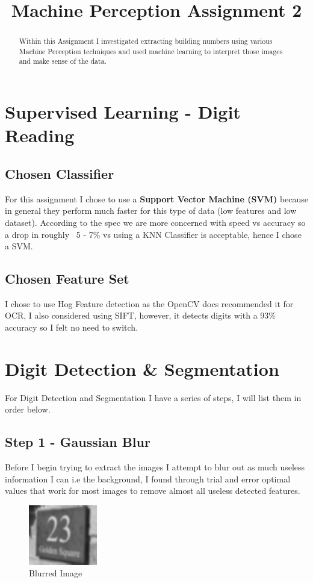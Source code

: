 \documentclass[conference]{IEEEtran}
\begin{document}
\title{Machine Perception Assignment 2}

\author{
}

\maketitle

\begin{abstract}
Within this Assignment I investigated extracting building numbers using various Machine Perception techniques and used
machine learning to interpret those images and make sense of the data.
\end{abstract}

\section{Supervised Learning - Digit Reading}
\subsection{Chosen Classifier}
For this assignment I chose to use a \textbf{Support Vector Machine (SVM)} because in general they perform much faster for this
type of data (low features and low dataset). According to the spec we are more concerned with speed vs accuracy so a drop in
roughly ~5 - 7\% vs using a KNN Classifier is acceptable, hence I chose a SVM.
\subsection{Chosen Feature Set}
I chose to use Hog Feature detection as the OpenCV docs recommended it for OCR, I also considered using SIFT, however, it detects
digits with a 93\% accuracy so I felt no need to switch.

\section{Digit Detection \& Segmentation}
For Digit Detection and Segmentation I have a series of steps, I will list them in order below.
\subsection{Step 1 - Gaussian Blur}
Before I begin trying to extract the images I attempt to blur out as much useless information I can i.e the background,
I found through trial and error optimal values that work for most images to remove almost all useless detected features.
\begin{figure}[!htbp]
    \centerline{{\includegraphics[width=30mm, scale=0.5]{blur.png}}}
    \caption{Blurred Image}
    \label{fig}
\end{figure}
\end{document}
